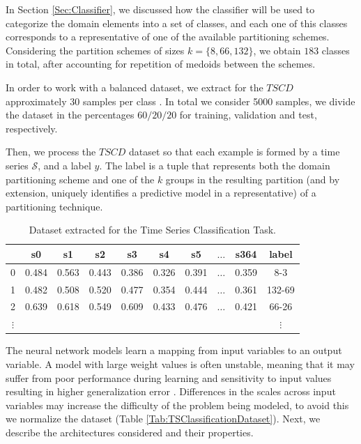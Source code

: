 
In Section \ref{Sec:Classifier}, we discussed how the classifier will be used to categorize the domain elements into a set of classes, and each one of this classes corresponds to a representative of one of the available partitioning schemes. Considering the partition schemes of sizes $k=\{8, 66, 132\}$, we obtain $183$ classes in total, after accounting for repetition of medoids between the schemes.

In order to work with a balanced dataset, we extract for the $TSCD$ approximately $30$ samples per class \cite{Du2018}. In total we consider 5000 samples, we divide the dataset in the percentages $60/20/20$ for training, validation and test, respectively.

Then, we process the $TSCD$ dataset so that each example is formed by a time series $\mathcal{S}$, and a label $y$. The label is a tuple that represents both the domain partitioning scheme and one of the $k$ groups in the resulting partition (and by extension, uniquely identifies a predictive model in a representative) of a partitioning technique.

\begin{table}[h]
	\centering
	\small
	\begin{tabular}[h]{|c|c|c|c|c|c|c|c|c|c|}
		\hline
		  & s0    & s1    & s2    & s3    & s4    &	s5    & $\ldots$ & s364  &   label \\ \hline
		0 & 0.484 & 0.563 & 0.443 & 0.386 & 0.326 &	0.391 & $\ldots$ & 0.359 &   8-3 \\
		1 &	0.482 &	0.508 &	0.520 &	0.477 &	0.354 &	0.444 & $\ldots$ & 0.361 & 132-69 \\
		2 &	0.639 & 0.618 &	0.549 &	0.609 &	0.433 & 0.476 & $\ldots$ & 0.421 &	66-26 \\ 
		$\vdots$  & &     &       &       &       &       &          &       & $\vdots$ \\ \hline
	\end{tabular}
	\caption{Dataset extracted for the Time Series Classification Task.}
	\label{Table:DatasetTSC}
\end{table}

The neural network models learn a mapping from input variables to an output variable. A model with large weight values is often unstable, meaning that it may suffer from poor performance during learning and sensitivity to input values resulting in higher generalization error \cite{Lecun1998}. Differences in the scales across input variables may increase the difficulty of the problem being modeled, to avoid this we normalize the dataset (Table \ref{Tab:TSClassificationDataset}). Next, we describe the architectures considered and their properties.

